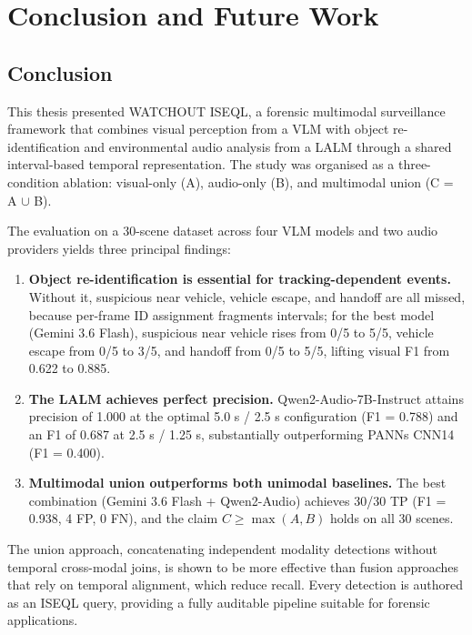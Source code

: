 \chapter{Conclusion and Future Work}
\label{ConclusionAndFutureWork}

\section{Conclusion}

This thesis presented WATCHOUT ISEQL, a forensic multimodal surveillance framework that combines visual perception from a VLM with object re-identification and environmental audio analysis from a LALM through a shared interval-based temporal representation. The study was organised as a three-condition ablation: visual-only (A), audio-only (B), and multimodal union (C = A $\cup$ B).

The evaluation on a 30-scene dataset across four VLM models and two audio providers yields three principal findings:

\begin{enumerate}
  \item \textbf{Object re-identification is essential for tracking-dependent events.} Without it, suspicious near vehicle, vehicle escape, and handoff are all missed, because per-frame ID assignment fragments intervals; for the best model (Gemini 3.6 Flash), suspicious near vehicle rises from 0/5 to 5/5, vehicle escape from 0/5 to 3/5, and handoff from 0/5 to 5/5, lifting visual F1 from 0.622 to 0.885.
  \item \textbf{The LALM achieves perfect precision.} Qwen2-Audio-7B-Instruct attains precision of 1.000 at the optimal 5.0 s / 2.5 s configuration (F1 = 0.788) and an F1 of 0.687 at 2.5 s / 1.25 s, substantially outperforming PANNs CNN14 (F1 = 0.400).
  \item \textbf{Multimodal union outperforms both unimodal baselines.} The best combination (Gemini 3.6 Flash + Qwen2-Audio) achieves 30/30 TP (F1 = 0.938, 4 FP, 0 FN), and the claim $C \ge \max(A, B)$ holds on all 30 scenes.
\end{enumerate}

The union approach, concatenating independent modality detections without temporal cross-modal joins, is shown to be more effective than fusion approaches that rely on temporal alignment, which reduce recall. Every detection is authored as an ISEQL query, providing a fully auditable pipeline suitable for forensic applications.

